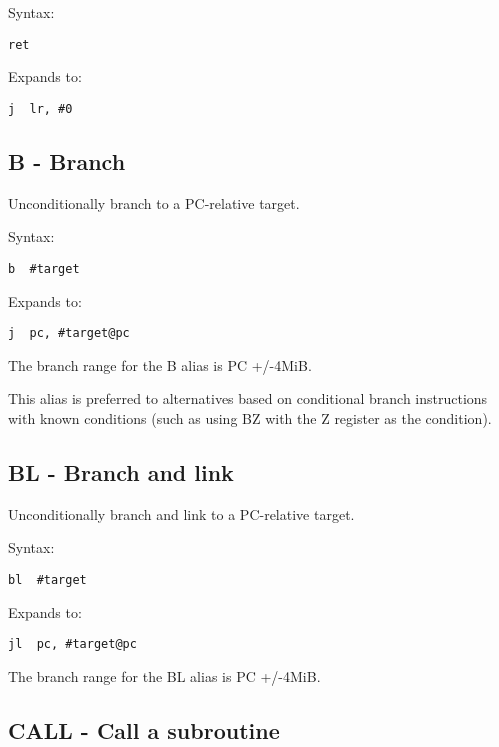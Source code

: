 Syntax:
\begin{lstlisting}[style=assembler]
  ret
\end{lstlisting}

Expands to:
\begin{lstlisting}[style=assembler]
  j  lr, #0
\end{lstlisting}

\subsection{B - Branch}

Unconditionally branch to a PC-relative target.

Syntax:
\begin{lstlisting}[style=assembler]
  b  #target
\end{lstlisting}

Expands to:
\begin{lstlisting}[style=assembler]
  j  pc, #target@pc
\end{lstlisting}

\begin{notebox}
The branch range for the B alias is PC +/-4MiB.

This alias is preferred to alternatives based on conditional branch
instructions with known conditions (such as using BZ with the Z register as the
condition).
\end{notebox}

\subsection{BL - Branch and link}

Unconditionally branch and link to a PC-relative target.

Syntax:
\begin{lstlisting}[style=assembler]
  bl  #target
\end{lstlisting}

Expands to:
\begin{lstlisting}[style=assembler]
  jl  pc, #target@pc
\end{lstlisting}

\begin{notebox}
The branch range for the BL alias is PC +/-4MiB.
\end{notebox}

\subsection{CALL - Call a subroutine}

